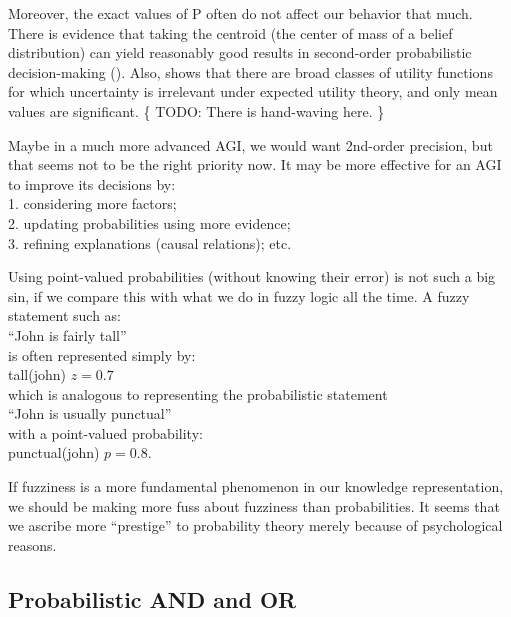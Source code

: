 Moreover, the exact values of P often do not affect our behavior that much.  There is evidence that taking the centroid (the center of mass of a belief distribution) can yield reasonably good results in second-order probabilistic decision-making (\citep*{Sundgren2006}).  Also, \citep*{Bier1993} shows that there are broad classes of utility functions for which uncertainty is irrelevant under expected utility theory, and only mean values are significant.  \{ TODO:  There is hand-waving here. \}

Maybe in a much more advanced AGI, we would want 2nd-order precision, but that seems not to be the right priority now.  It may be more effective for an AGI to improve its decisions by:\\
\hspace*{1cm} 1. considering more factors;\\
\hspace*{1cm} 2. updating probabilities using more evidence;\\
\hspace*{1cm} 3. refining explanations (causal relations);  etc.

Using point-valued probabilities (without knowing their error) is not such a big sin, if we compare this with what we do in fuzzy logic all the time.  A fuzzy statement such as:\\
\hspace*{1cm} ``John is fairly tall''\\
is often represented simply by:\\
\hspace*{1cm} tall(john) \hspace{0.5cm} $z = 0.7$\\
which is analogous to representing the probabilistic statement\\
\hspace*{1cm} ``John is usually punctual''\\
with a point-valued probability:\\
\hspace*{1cm} punctual(john) \hspace{0.5cm} $p = 0.8$.

If fuzziness is a more fundamental phenomenon in our knowledge representation, we should be making more fuss about fuzziness than probabilities.  It seems that we ascribe more ``prestige'' to probability theory merely because of psychological reasons.

\subsection{Probabilistic AND and OR}
\label{sec:probabilistic-AND-OR}


